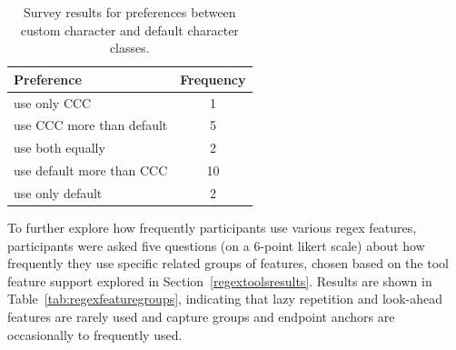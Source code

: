 \begin{table}
\caption{Survey results for preferences between custom character and default character classes. \label{tab:cccvsdefault}}
\begin{center}
\begin{tabular}{l|c}
Preference & Frequency \\ \hline
use only CCC & 1\\
use CCC more than default & 5 \\
use both equally & 2\\
use default more than CCC & 10\\
use only default & 2\\

\end{tabular}
\end{center}
\end{table}

To further explore how frequently participants use various regex features, participants were asked five questions (on a 6-point likert scale) about how frequently they use specific related groups of features,
chosen based on the tool feature support explored in Section~\ref{regextoolsresults}.
Results are shown in Table~\ref{tab:regexfeaturegroups}, indicating that lazy repetition and look-ahead features are rarely used and capture groups and endpoint anchors are occasionally to frequently used.


